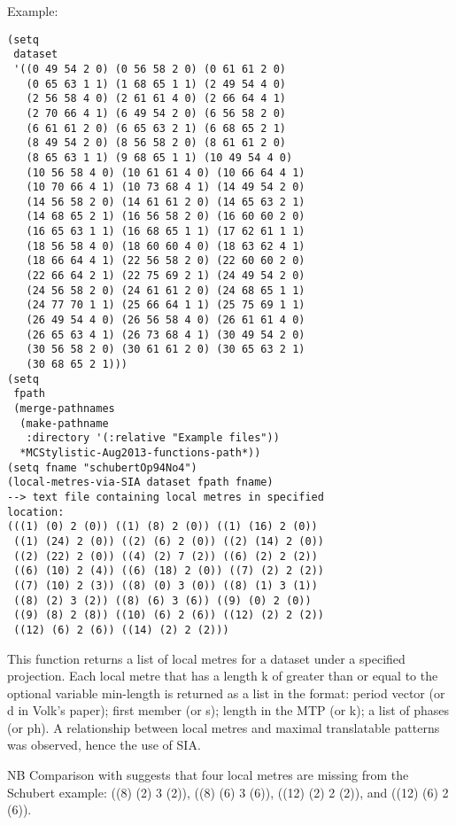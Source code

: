 \vspace{0.5cm}
\noindent Example:
\begin{verbatim}
(setq
 dataset
 '((0 49 54 2 0) (0 56 58 2 0) (0 61 61 2 0)
   (0 65 63 1 1) (1 68 65 1 1) (2 49 54 4 0)
   (2 56 58 4 0) (2 61 61 4 0) (2 66 64 4 1)
   (2 70 66 4 1) (6 49 54 2 0) (6 56 58 2 0)
   (6 61 61 2 0) (6 65 63 2 1) (6 68 65 2 1)
   (8 49 54 2 0) (8 56 58 2 0) (8 61 61 2 0)
   (8 65 63 1 1) (9 68 65 1 1) (10 49 54 4 0)
   (10 56 58 4 0) (10 61 61 4 0) (10 66 64 4 1)
   (10 70 66 4 1) (10 73 68 4 1) (14 49 54 2 0)
   (14 56 58 2 0) (14 61 61 2 0) (14 65 63 2 1)
   (14 68 65 2 1) (16 56 58 2 0) (16 60 60 2 0)
   (16 65 63 1 1) (16 68 65 1 1) (17 62 61 1 1)
   (18 56 58 4 0) (18 60 60 4 0) (18 63 62 4 1)
   (18 66 64 4 1) (22 56 58 2 0) (22 60 60 2 0)
   (22 66 64 2 1) (22 75 69 2 1) (24 49 54 2 0)
   (24 56 58 2 0) (24 61 61 2 0) (24 68 65 1 1)
   (24 77 70 1 1) (25 66 64 1 1) (25 75 69 1 1)
   (26 49 54 4 0) (26 56 58 4 0) (26 61 61 4 0)
   (26 65 63 4 1) (26 73 68 4 1) (30 49 54 2 0)
   (30 56 58 2 0) (30 61 61 2 0) (30 65 63 2 1)
   (30 68 65 2 1)))
(setq
 fpath
 (merge-pathnames
  (make-pathname
   :directory '(:relative "Example files"))
  *MCStylistic-Aug2013-functions-path*))
(setq fname "schubertOp94No4")
(local-metres-via-SIA dataset fpath fname)
--> text file containing local metres in specified
location:
(((1) (0) 2 (0)) ((1) (8) 2 (0)) ((1) (16) 2 (0))
 ((1) (24) 2 (0)) ((2) (6) 2 (0)) ((2) (14) 2 (0))
 ((2) (22) 2 (0)) ((4) (2) 7 (2)) ((6) (2) 2 (2))
 ((6) (10) 2 (4)) ((6) (18) 2 (0)) ((7) (2) 2 (2))
 ((7) (10) 2 (3)) ((8) (0) 3 (0)) ((8) (1) 3 (1))
 ((8) (2) 3 (2)) ((8) (6) 3 (6)) ((9) (0) 2 (0))
 ((9) (8) 2 (8)) ((10) (6) 2 (6)) ((12) (2) 2 (2))
 ((12) (6) 2 (6)) ((14) (2) 2 (2)))
\end{verbatim}

\noindent This function returns a list of local metres
\citep{volk2008} for a dataset under a specified
projection. Each local metre that has a length k of
greater than or equal to the optional variable
min-length is returned as a list in the format:
period vector (or d in Volk's \citeyear{volk2008}
paper); first member (or s); length in the MTP (or k);
a list of phases (or ph). A relationship between local
metres and maximal translatable patterns was observed,
hence the use of SIA.

NB Comparison with \citet{volk2008} suggests that four
local metres are missing from the Schubert example:
((8) (2) 3 (2)), ((8) (6) 3 (6)), ((12) (2) 2 (2)),
and ((12) (6) 2 (6)).


